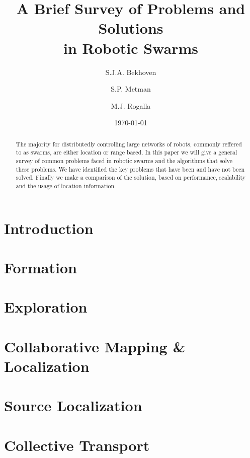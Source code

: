 \documentclass[a4paper]{article}
\title{A Brief Survey of Problems and Solutions \\ in Robotic Swarms}
\author{S.J.A. Bekhoven  \and
    S.P. Metman \and
    M.J. Rogalla}
\date{\today}
\begin{document}
\maketitle
\thispagestyle{empty}

\begin{abstract}
The majority for distributedly controlling large networks of robots, commonly reffered to as swarms, are either location or range based.
In this paper we will give a general survey of common problems faced in robotic swarms and the algorithms that solve these problems.
We have identified the key problems that have been and have not been solved. Finally we make a comparison of the solution, based on performance, scalability and the usage of location information.
\end{abstract}


\section{Introduction}
  

\section{Formation}
  \label{sec:Formation}
  

\section{Exploration}
  \label{sec:Exploration}
  
 
\section{Collaborative Mapping \& Localization}
  \label{sec:CollaborativeMapping}
  
 
\section{Source Localization}
  \label{sec:Localization}
  

\section{Collective Transport}
  \label{sec:CollectiveTransport}
  
  
\end{document}
